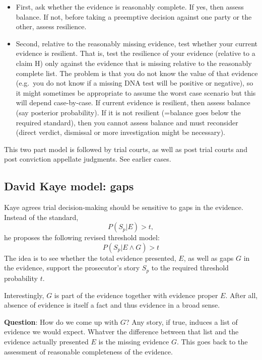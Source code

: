 \documentclass[
  10pt,
  dvipsnames,enabledeprecatedfontcommands]{scrartcl}
\begin{document}
\begin{itemize}
\item
  First, ask whether the evidence is reasonably complete. If yes, then
  assess balance. If not, before taking a preemptive decision against
  one party or the other, assess resilience.
\item
  Second, relative to the reasonably missing evidence, test whether your
  current evidence is resilient. That is, test the resilience of your
  evidence (relative to a claim H) only against the evidence that is
  missing relative to the reasonably complete list. The problem is that
  you do not know the value of that evidence (e.g.~you do not know if a
  missing DNA test will be positive or negative), so it might sometimes
  be appropriate to assume the worst case scenario but this will depend
  case-by-case. If current evidence is resilient, then assess balance
  (say posterior probability). If it is not resilient (=balance goes
  below the required standard), then you cannot assess balance and must
  reconsider (direct verdict, dismissal or more investigation might be
  necessary).
\end{itemize}

This two part model is followed by trial courts, as well as post trial
courts and post conviction appellate judgments. See earlier cases.

\hypertarget{david-kaye-model-gaps}{%
\subsection{David Kaye model: gaps}\label{david-kaye-model-gaps}}

Kaye agrees trial decision-making should be sensitive to gaps in the
evidence. Instead of the standard, \[P(S_p | E)>t,\] he proposes the
following revised threshold model: \[P(S_p | E \wedge G)>t\] The idea is
to see whether the total evidence presented, \(E\), as well as gaps
\(G\) in the evidence, support the prosecutor's story \(S_p\) to the
required threshold probability \(t\).

Interestingly, \(G\) is part of the evidence together with evidence
proper \(E\). After all, absence of evidence is itself a fact and thus
evidence in a broad sense.

\textbf{Question}: How do we come up with \(G\)? Any story, if true,
induces a list of evidence we would expect. Whatver the difference
between that list and the evidence actually presented \(E\) is the
missing evidence \(G\). This goes back to the assessment of reasonable
completeness of the evidence.
\end{document}
